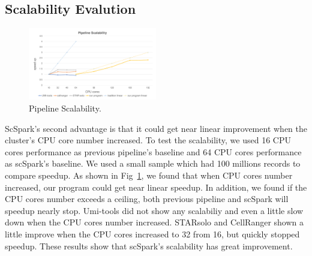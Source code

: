 \documentclass[10pt,journal,compsoc]{IEEEtran}
\begin{document}
\subsection{Scalability Evalution}
\begin{figure}
	\includegraphics[width=0.5\textwidth]{fig4.pdf}
	\caption{Pipeline Scalability.} \label{fig4}
\end{figure}
ScSpark's second advantage is that it could get near linear improvement when the cluster's CPU core number increased. 
To test the scalability, we used 16 CPU cores performance as previous pipeline's baseline and 64 CPU cores performance as scSpark's baseline. 
We used a small sample which had 100 millions records to compare speedup. 
As shown in Fig~\ref{fig4}, we found that when CPU cores number increased, our program could get near linear speedup. 
In addition, we found if the CPU cores number exceeds a ceiling, both previous pipeline and scSpark will speedup nearly stop. 
Umi-tools did not show any scalabiliy and even a little slow down when the CPU cores number increased. 
STARsolo and CellRanger shown a little improve when the CPU cores increased to 32 from 16, but quickly stopped speedup. 
These results show that scSpark's scalability has great improvement. 
\end{document}
